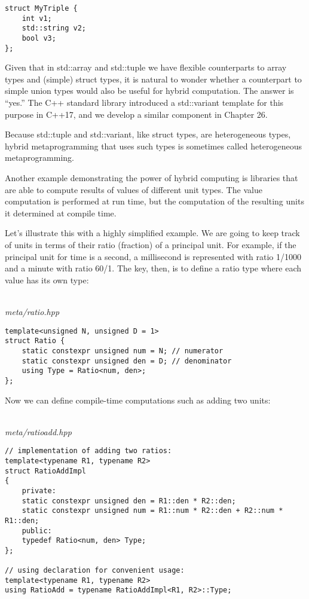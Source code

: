 \begin{lstlisting}[style=styleCXX]
struct MyTriple {
	int v1;
	std::string v2;
	bool v3;
};
\end{lstlisting}

Given that in std::array and std::tuple we have flexible counterparts to array types and (simple) struct types, it is natural to wonder whether a counterpart to simple union types would also be useful for hybrid computation. The answer is “yes.” The C++ standard library introduced a std::variant template for this purpose in C++17, and we develop a similar component in Chapter 26. 

Because std::tuple and std::variant, like struct types, are heterogeneous types, hybrid metaprogramming that uses such types is sometimes called heterogeneous metaprogramming.


Another example demonstrating the power of hybrid computing is libraries that are able to compute results of values of different unit types. The value computation is performed at run time, but the computation of the resulting units it determined at compile time.

Let’s illustrate this with a highly simplified example. We are going to keep track of units in terms of their ratio (fraction) of a principal unit. For example, if the principal unit for time is a second, a millisecond is represented with ratio 1/1000 and a minute with ratio 60/1. The key, then, is to define a ratio type where each value has its own type:

\hspace*{\fill} \\ %
\noindent
\textit{meta/ratio.hpp}
\begin{lstlisting}[style=styleCXX]
template<unsigned N, unsigned D = 1>
struct Ratio {
	static constexpr unsigned num = N; // numerator
	static constexpr unsigned den = D; // denominator
	using Type = Ratio<num, den>;
};
\end{lstlisting}

Now we can define compile-time computations such as adding two units:

\hspace*{\fill} \\ %
\noindent
\textit{meta/ratioadd.hpp}
\begin{lstlisting}[style=styleCXX]
// implementation of adding two ratios:
template<typename R1, typename R2>
struct RatioAddImpl
{
	private:
	static constexpr unsigned den = R1::den * R2::den;
	static constexpr unsigned num = R1::num * R2::den + R2::num * R1::den;
	public:
	typedef Ratio<num, den> Type;
};

// using declaration for convenient usage:
template<typename R1, typename R2>
using RatioAdd = typename RatioAddImpl<R1, R2>::Type;
\end{lstlisting}

